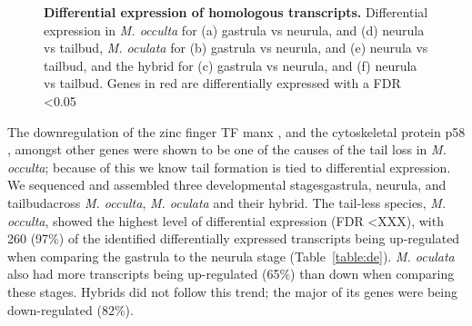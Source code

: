 \begin{figure}
{	}
	\caption{\textbf{Differential expression of homologous transcripts.} Differential expression in \textit{M. occulta} for (a) gastrula vs neurula, and (d) neurula vs tailbud, \textit{M. oculata} for (b) gastrula vs neurula, and (e) neurula vs tailbud, and the hybrid for (c) gastrula vs neurula, and (f) neurula vs tailbud. Genes in red are differentially expressed with a FDR \textless 0.05}
	\label{fig:de_plots}
\end{figure}

The downregulation of the zinc finger TF manx \cite{swalla_requirement_1996}, and the cytoskeletal protein p58 \cite{swalla_identification_1991}, amongst other genes were shown to be one of the causes of the tail loss in \textit{M. occulta}; because of this we know tail formation is tied to differential expression. We sequenced and assembled three developmental stages\textemdash gastrula, neurula, and tailbud\textemdash across \textit{M. occulta}, \textit{M. oculata} and their hybrid. The tail-less species, \textit{M. occulta}, showed the highest level of differential expression (FDR \textless XXX), with 260 (97\%) of the identified differentially expressed transcripts being up-regulated when comparing the gastrula to the neurula stage (Table~\ref{table:de}). \textit{M. oculata} also had more transcripts being up-regulated (65\%) than down when comparing these stages. Hybrids did not follow this trend; the major of its genes were being down-regulated (82\%).  

